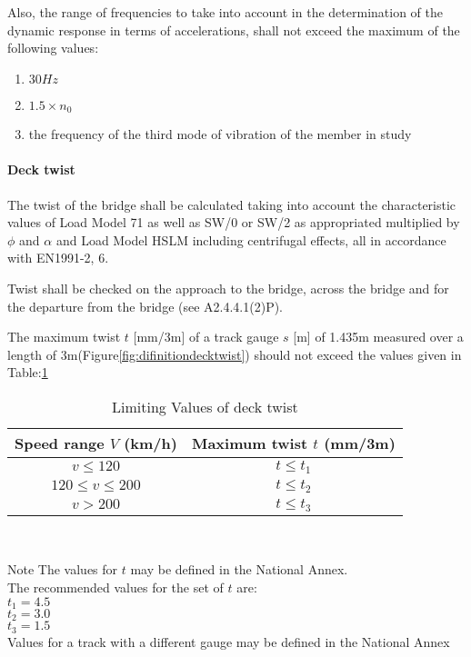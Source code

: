 Also, the range of frequencies to take into account in the determination of the dynamic response in terms of accelerations, shall not exceed the maximum of the following values:

\begin{enumerate}
	\item $30Hz$
	\item $1.5\times n_0$
	\item the frequency of the third mode of vibration of the member in study
\end{enumerate}

\paragraph{Deck twist}
The twist of the bridge shall be calculated taking into account the characteristic values of Load Model 71 as well as SW/0 or SW/2 as appropriated multiplied by $\phi$ and $\alpha$ and Load Model HSLM including centrifugal effects, all in accordance with EN1991-2, 6. 

Twist shall be checked on the approach to the bridge, across the bridge and for the departure from the bridge (see A2.4.4.1(2)P).

The maximum twist $t$ [mm/3m] of a track gauge $s$ [m] of 1.435m measured over a length of 3m(Figure\ref{fig:difinitiondecktwist}) should not exceed the values given in Table:\ref{tab:limitingvaluedecktwist}

\begin{table}[h]
	\centering
	\begin{tabular}{cc}
		\hline
		Speed range $V$ (km/h) & Maximum twist $t$ (mm/3m) \\
		\hline
		$v\leq 120$ & $t\leq t_1$ \\
		$120\leq v \leq 200$ & $t\leq t_2$ \\
		$v>200$ & $t\leq t_3$ \\
		\hline
	\end{tabular}
	\\
	\raggedright{Note The values for $t$ may be defined in the National Annex.\\ The recommended values for the set of $t$ are:\\ $t_1=4.5$\\$t_2=3.0$\\$t_3=1.5$\\Values for a track with a different gauge may be defined in the National Annex}
	\caption{Limiting Values of deck twist}
	\label{tab:limitingvaluedecktwist}
\end{table}
	
